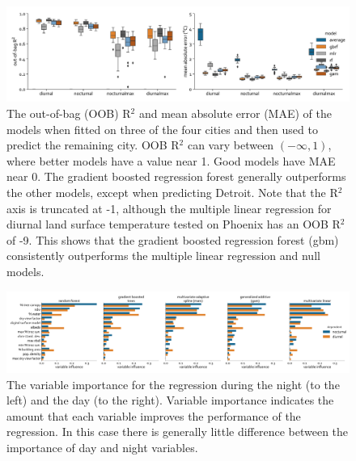 \documentclass[final,3p,times,twocolumn,sort&compress]{elsarticle}
\begin{document}
\begin{figure}
    \centering
    \includegraphics[width=\linewidth]{fig/report/holdout_results_500.pdf}
    \caption{
    The out-of-bag (OOB) R$^2$ and mean absolute error (MAE) of the models when fitted on three of the four cities and then used to predict the remaining city. OOB R$^2$ can vary between $(-\infty, 1)$, where better models have a value near 1. Good models have MAE near 0. The gradient boosted regression forest generally outperforms the other models, except when predicting Detroit. Note that the R$^2$ axis is truncated at -1, although the multiple linear regression for diurnal land surface temperature tested on Phoenix has an OOB R$^2$ of -9.  This shows that the gradient boosted regression forest (gbm) consistently outperforms the multiple linear regression and null models.
    }
    \label{fig:holdout_500}
\end{figure}

\begin{figure}
\begin{center}
\includegraphics[width=\textwidth]{fig/report/variableImportance_500.pdf}
\caption{The variable importance for the regression during the night (to the left) and the day (to the right). Variable importance indicates the amount that each variable improves the performance of the regression.
In this case there is generally little difference between the importance of day and night variables.}
\label{fig:importance_500}
\end{center}
\end{figure}
\end{document}

